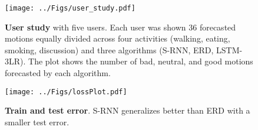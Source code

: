 \documentclass[10pt,twocolumn,letterpaper]{article}
\begin{document}
\begin{figure}[t]
\centering
\texttt{[image: ../Figs/user\_study.pdf]}
\caption{\textbf{User study} with five users. Each user was shown 36 forecasted motions equally divided across four activities (walking, eating, smoking, discussion) and three algorithms (S-RNN, ERD, LSTM-3LR). The plot shows the number of bad, neutral, and good motions forecasted by each algorithm.}
\label{fig:user_study}
\end{figure}


\begin{figure}[t]
\centering
\texttt{[image: ../Figs/lossPlot.pdf]}
\caption{ \textbf{Train and test error}. S-RNN generalizes better than ERD with a smaller test error. }
\label{fig:loss}
\end{figure}



\setcounter{subsection}{3}
\end{document}
